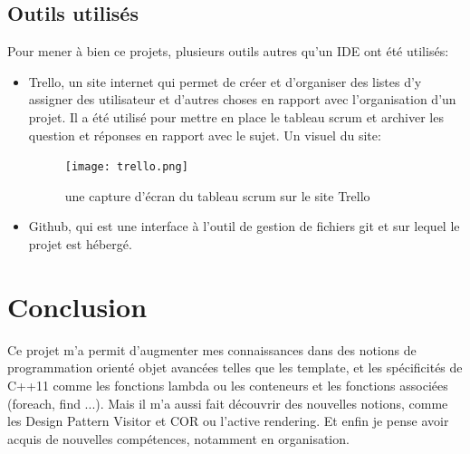 \documentclass[10pt,a4paper]{report}
\begin{document}
\begin{spacing}{0.8}
\chapter{Outils utilisés}
Pour mener à bien ce projets, plusieurs outils autres qu'un IDE ont été utilisés:
\begin{itemize}
\item Trello, un site internet qui permet de créer et d'organiser des listes d'y assigner des utilisateur et d'autres choses en rapport avec l'organisation d'un projet. Il a été utilisé pour mettre en place le tableau scrum et archiver les question et réponses en rapport avec le sujet. Un visuel du site:
\begin{figure}[H]
\texttt{[image: trello.png]}
\caption{une capture d'écran du tableau scrum sur le site Trello}
\end{figure}
\item Github, qui est une interface à l'outil de gestion de fichiers git et sur lequel le projet est hébergé.
\end{itemize} 

\part{Conclusion}
Ce projet m'a permit d'augmenter mes connaissances dans des notions de programmation orienté objet avancées telles que les template, et les spécificités de C++11 comme les fonctions lambda ou les conteneurs et les fonctions associées (foreach, find ...). Mais il m'a aussi fait découvrir des nouvelles notions, comme les Design Pattern Visitor et COR ou l'active rendering. Et enfin je pense avoir acquis de nouvelles compétences, notamment en organisation.



\end{spacing}
\end{document}

